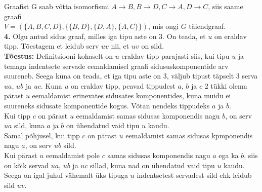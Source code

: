 \documentclass{article}
\begin{document}
Graafist G saab v\~otta isomorfismi $A\to B, B\to D, C\to A, D\to C$, siis saame graafi \\$V=(\{A,B,C,D\},\{\{B,D\},\{D,A\},\{A,C\}\})$, mis ongi $G$ t\"aiendgraaf.
\pagebreak\\
\textbf{4.} Olgu antud sidus graaf, milles iga tipu aste on 3. On teada, et $u$ on eraldav tipp. T\~oestagem et leidub serv $uv$ nii, et $uv$ on sild.\\
\textbf{T\~oestus:} Definitsiooni kohaselt on $u$ eraldav tipp parajasti siis, kui tipu $u$ ja temaga indentsete servade eemaldamisel graafi sidususkomponentide arv suureneb. Seega kuna on teada, et iga tipu aste on 3, v\"aljub tipust t\"apselt 3 serva $ua$, $ub$ ja $uc$. Kuna $u$ on eraldav tipp, peavad tippudest $a$, $b$ ja $c$ 2 t\"ukki olema p\"arast $u$ eemaldamist erinevates sidusates komponentides, kuna muidu ei suureneks sidusate komponentide kogus. V\~otan nendeks tippudeks $a$ ja $b$. \\
Kui tipp $c$ on p\"arast $u$ eemaldamist samas sidusas komponendis nagu $b$, on serv $ua$ sild, kuna $a$ ja $b$ on \"uhendatud vaid tipu $u$ kaudu. \\
Samal p\~ohjusel, kui tipp $c$ on p\"arast $u$ eemaldamist samas sidusas kpmponendis nagu $a$, on serv $ub$ sild.\\
 Kui p\"arast $u$ eemaldamist pole $c$ samas sidusas komponendis nagu $a$ ega ka $b$, siis on k\~oik servad $ua$, $ub$ ja $uc$ sillad, kuna nad on \"uhendatud vaid tipu $u$ kaudu. Seega on igal juhul v\"ahemalt \"uks tipuga $u$ indentsetest servadest sild ehk leidub sild $uv$.
\end{document}
